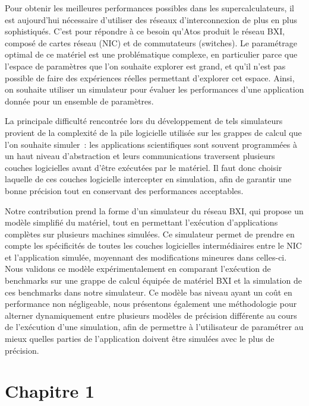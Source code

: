 
Pour obtenir les meilleures performances possibles dans les supercalculateurs,
il est aujourd'hui nécessaire d'utiliser des réseaux d'interconnexion de plus en
plus sophistiqués. C'est pour répondre à ce besoin qu'Atos produit le réseau
BXI, composé de cartes réseau (NIC) et de commutateurs (switches). Le
paramétrage optimal de ce matériel est une problématique complexe, en
particulier parce que l'espace de paramètres que l'on souhaite explorer est
grand, et qu'il n'est pas possible de faire des expériences réelles permettant
d'explorer cet espace. Ainsi, on souhaite utiliser un simulateur pour évaluer
les performances d'une application donnée pour un ensemble de paramètres. 

La principale difficulté rencontrée lors du développement de tels simulateurs
provient de la complexité de la pile logicielle utilisée sur les grappes de
calcul que l'on souhaite simuler~: les applications scientifiques sont souvent
programmées à un haut niveau d'abstraction et leurs communications traversent
plusieurs couches logicielles avant d'être exécutées par le matériel. Il faut
donc choisir laquelle de ces couches logicielle intercepter en simulation, afin
de garantir une bonne précision tout en conservant des performances acceptables. 

Notre contribution prend la forme d'un simulateur du réseau BXI, qui propose un
modèle simplifié du matériel, tout en permettant l'exécution d'applications
complètes sur plusieurs machines simulées. Ce simulateur permet de prendre en
compte les spécificités de toutes les couches logicielles intermédiaires entre
le NIC et l'application simulée, moyennant des modifications mineures dans
celles-ci. Nous validons ce modèle expérimentalement en comparant l'exécution de
benchmarks sur une grappe de calcul équipée de matériel BXI et la simulation de
ces benchmarks dans notre simulateur. Ce modèle bas niveau ayant un coût en
performance non négligeable, nous présentons également une méthodologie pour
alterner dynamiquement entre plusieurs modèles de précision différente au cours
de l'exécution d'une simulation, afin de permettre à l'utilisateur de paramétrer
au mieux quelles parties de l'application doivent être simulées avec le plus de
précision.


\section*{Chapitre 1}

